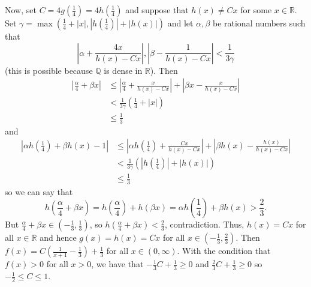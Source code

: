 Now, set $C=4g\left(\frac{1}{4}\right)=4h\left(\frac{1}{4}\right)$ and suppose that $h\left(x\right)\neq Cx$ for some $x\in\mathbb{R}$. Set $\gamma=\max\left(\frac{1}{4}+\left|x\right|,\left|h\left(\frac{1}{4}\right)\right|+\left|h\left(x\right)\right|\right)$ and let $\alpha,\beta$ be rational numbers such that \[\left|\alpha+\frac{4x}{h\left(x\right)-Cx}\right|,\left|\beta-\frac{1}{h\left(x\right)-Cx}\right|<\frac{1}{3\gamma}\] (this is possible because $\mathbb{Q}$ is dense in $\mathbb{R}$). Then
\begin{align*}
	\left|\frac{\alpha}{4}+\beta x\right|&\leq\left|\frac{\alpha}{4}+\frac{x}{h\left(x\right)-Cx}\right|+\left|\beta x-\frac{x}{h\left(x\right)-Cx}\right|\\
	&<\frac{1}{3\gamma}\left(\frac{1}{4}+\left|x\right|\right)\\
	&\leq\frac{1}{3}
\end{align*}
and
\begin{align*}
	\left|\alpha h\left(\frac{1}{4}\right)+\beta h\left(x\right)-1\right|&\leq\left|\alpha h\left(\frac{1}{4}\right)+\frac{Cx}{h\left(x\right)-Cx}\right|+\left|\beta h\left(x\right)-\frac{h\left(x\right)}{h\left(x\right)-Cx}\right|\\
	&<\frac{1}{3\gamma}\left(\left|h\left(\frac{1}{4}\right)\right|+\left|h\left(x\right)\right|\right)\\
	&\leq\frac{1}{3}
\end{align*}
so we can say that \[h\left(\frac{\alpha}{4}+\beta x\right)=h\left(\frac{\alpha}{4}\right)+h\left(\beta x\right)=\alpha h\left(\frac{1}{4}\right)+\beta h\left(x\right)>\frac{2}{3}.\] But $\frac{\alpha}{4}+\beta x\in\left(-\frac{1}{3},\frac{1}{3}\right)$, so $h\left(\frac{\alpha}{4}+\beta x\right)<\frac{2}{3}$, contradiction. Thus, $h\left(x\right)=Cx$ for all $x\in\mathbb{R}$ and hence $g\left(x\right)=h\left(x\right)=Cx$ for all $x\in\left(-\frac{1}{3},\frac{2}{3}\right)$. Then $f\left(x\right)=C\left(\frac{1}{x+1}-\frac{1}{3}\right)+\frac{1}{3}$ for all $x\in\left(0,\infty\right)$. With the condition that $f\left(x\right)>0$ for all $x>0$, we have that $-\frac{1}{3}C+\frac{1}{3}\geq0$ and $\frac{2}{3}C+\frac{1}{3}\geq0$ so $-\frac{1}{2}\leq C\leq1$.